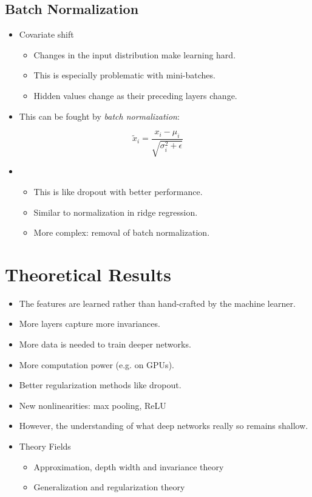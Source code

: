 		\subsection{Batch Normalization}
			\begin{itemize}
				\item Covariate shift
					\begin{itemize}
						\item Changes in the input distribution make learning hard.
						\item This is especially problematic with mini-batches.
						\item Hidden values change as their preceding layers change.
					\end{itemize}
				\item This can be fought by \emph{batch normalization}:
			\end{itemize}
			\begin{equation}
				\tilde{x}_i = \frac{x_i - \mu_i}{\sqrt{\sigma_i^2 + \epsilon}}
			\end{equation}
			\begin{itemize}
				\item[]
					\begin{itemize}
						\item This is like dropout with better performance.
						\item Similar to normalization in ridge regression.
						\item More complex: removal of batch normalization.
					\end{itemize}
			\end{itemize}

	\section{Theoretical Results}
		\begin{itemize}
			\item The features are learned rather than hand-crafted by the machine learner.
			\item More layers capture more invariances.
			\item More data is needed to train deeper networks.
			\item More computation power (e.g. on GPUs).
			\item Better regularization methods like dropout.
			\item New nonlinearities: max pooling, ReLU
			\item However, the understanding of what deep networks really so remains shallow.
			\item Theory Fields
				\begin{itemize}
					\item Approximation, depth width and invariance theory
					\item Generalization and regularization theory
				\end{itemize}
		\end{itemize}


